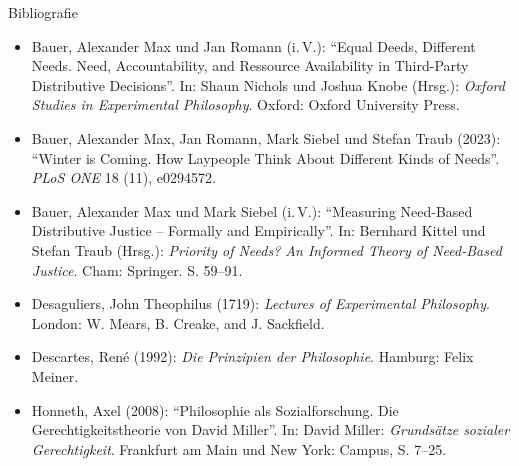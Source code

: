 \documentclass[xcolor=table,9pt,aspectratio=169]{beamer}
\begin{document}
\begin{frame}{\vspace*{10mm}Bibliografie}
\vspace*{-10mm}
{\footnotesize
\begin{itemize}[label=,leftmargin=2em,itemindent=-2em]
   \item Bauer, Alexander Max und Jan Romann (i.\,V.): \enquote{Equal Deeds, Different Needs. Need, Accountability, and Ressource Availability in Third-Party Distributive Decisions}. In: Shaun Nichols und Joshua Knobe (Hrsg.): \textit{Oxford Studies in Experimental Philosophy}. Oxford: Oxford University Press.
   \item Bauer, Alexander Max, Jan Romann, Mark Siebel und Stefan Traub (2023): \enquote{Winter is Coming. How Laypeople Think About Different Kinds of Needs}. \textit{PLoS ONE} 18 (11), e0294572.
   \item Bauer, Alexander Max und Mark Siebel (i.\,V.): \enquote{Measuring Need-Based Distributive Justice -- Formally and Empirically}. In: Bernhard Kittel und Stefan Traub (Hrsg.): \textit{Priority of Needs? An Informed Theory of Need-Based Justice}. Cham: Springer. S. 59--91.
   \item Desaguliers, John Theophilus (1719): \textit{Lectures of Experimental Philosophy}. London: W. Mears, B. Creake, and J. Sackfield.
   \item Descartes, René (1992): \textit{Die Prinzipien der Philosophie}. Hamburg: Felix Meiner.
   \item Honneth, Axel (2008): \enquote{Philosophie als Sozialforschung. Die Gerechtigkeitstheorie von David Miller}. In: David Miller: \textit{Grundsätze sozialer Gerechtigkeit}. Frankfurt am Main und New York: Campus, S. 7--25.
\end{itemize}
}
\end{frame}
\end{document}
